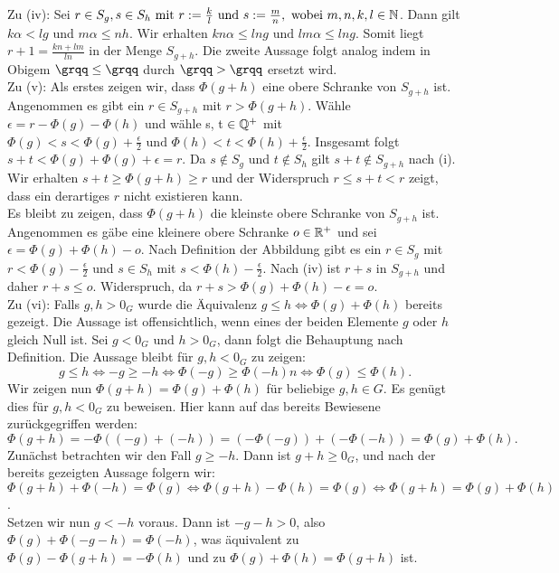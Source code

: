 {Zu (iv): Sei $r \in S_g, s \in S_h \text{ mit } r := \frac{k}{l} \text{ und } s:= \frac{m}{n}, \text{ wobei } m, n ,k, l \in \mathbb{N}$. Dann gilt $k\alpha < lg $ und $ m\alpha \le nh$. Wir erhalten $kn\alpha \le lng \text{ und } lm\alpha \le lng.$ Somit liegt $r+1 = \frac{kn+lm}{ln}$ in der Menge $S_{g+h}.$ Die zweite Aussage folgt analog indem in Obigem $\grqq \le\grqq$ durch $\grqq>\grqq$ ersetzt wird.\\
Zu (v): Als erstes zeigen wir, dass $\Phi\left(g + h\right)$ eine obere Schranke von $S_{g+h}$ ist. Angenommen es gibt ein $r\in S_{g+h}$ mit $r > \Phi\left(g + h\right)$. Wähle $\epsilon = r - \Phi\left(g\right) - \Phi\left(h\right)$ und wähle s, t $\in \mathbb{Q}^{+}$ mit $\Phi(g) < s < \Phi(g) + \frac{\epsilon}{2} \text{ und } \Phi\left(h\right) < t < \Phi\left(h\right) +\frac{\epsilon}{2}$. Insgesamt folgt $s + t < \Phi\left(g\right) + \Phi\left(g\right) + \epsilon = r$. Da $s \notin S_g$ und $t \notin S_h$ gilt $s+t \notin S_{g+h}$ nach (i). Wir erhalten $s+ t \geq \Phi\left(g+h\right) \geq r$ und der Widerspruch $ r \le s+t < r$ zeigt, dass ein derartiges $r$ nicht existieren kann.\\
Es bleibt zu zeigen, dass $\Phi\left(g + h\right)$ die kleinste obere Schranke von $S_{g+h}$ ist. Angenommen es gäbe eine kleinere obere Schranke $ o \in \mathbb{R}^{+}$ und sei $\epsilon = \Phi(g) + \Phi(h) - o$. Nach Definition der Abbildung gibt es ein $r\in S_g$ mit $r < \Phi(g) - \frac{\epsilon}{2}$ und $ s \in S_h$ mit $s < \Phi(h) - \frac{\epsilon}{2}.$ Nach (iv) ist $r+s$ in $S_{g+h} $ und daher $ r +s \le o$. Widerspruch, da $r+s >\Phi(g) + \Phi(h) - \epsilon = o$.\\
Zu (vi): Falls $g, h > 0_{G}$ wurde die Äquivalenz $g\le h \Leftrightarrow \Phi(g) + \Phi(h)$ bereits gezeigt. Die Aussage ist offensichtlich, wenn eines der beiden Elemente $g$ oder $h$ gleich Null ist. Sei $g < 0_G \text{ und } h > 0_G$, dann folgt die Behauptung nach Definition. Die Aussage bleibt für $g, h < 0_G$ zu zeigen: 
\[g \le h \Leftrightarrow -g \geq -h \Leftrightarrow \Phi\left(-g\right) \geq \Phi\left(-h\right)n \Leftrightarrow \Phi\left(g\right) \le \Phi\left(h\right).\]
Wir zeigen nun $\Phi(g+h) = \Phi\left(g\right) +\Phi\left(h\right)$ für beliebige $g,h \in G$. Es genügt dies für $g, h < 0_G$ zu beweisen. Hier kann auf das bereits Bewiesene zurückgegriffen werden: 
\[\Phi\left(g+h\right) = −\Phi\left((−g)+(−h)\right) = (−\Phi(−g))+(−\Phi(−h)) = \Phi(g)+\Phi(h).\]
Zunächst betrachten wir den Fall $g\geq −h$. Dann ist $g+h \geq 0_G$, und nach der bereits gezeigten Aussage folgern wir:\\
$\Phi(g+h)+ \Phi(−h) = \Phi(g) \Leftrightarrow \Phi(g+h)−\Phi(h) = \Phi(g) \Leftrightarrow \Phi(g+h) = \Phi(g)+ \Phi(h)$.\\
Setzen wir nun $g < −h$ voraus. Dann ist $−g−h > 0$, also $\Phi(g)+\Phi(−g−h) = \Phi(−h)$, was äquivalent zu $\Phi(g)−\Phi(g+h) = −\Phi(h)$ und zu $\Phi(g)+ \Phi(h) = \Phi(g+ h)$ ist.
}
